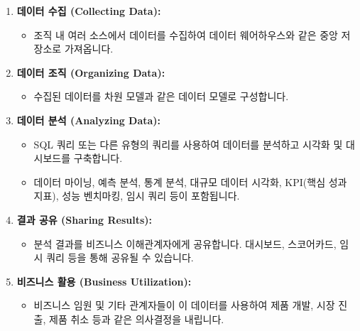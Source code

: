 \documentclass[11pt,a4paper]{article}
\begin{document}
\begin{enumerate}
    \item \textbf{데이터 수집 (Collecting Data):}
    \begin{itemize}
        \item 조직 내 여러 소스에서 데이터를 수집하여 데이터 웨어하우스와 같은 중앙 저장소로 가져옵니다.
    \end{itemize}
    \item \textbf{데이터 조직 (Organizing Data):}
    \begin{itemize}
        \item 수집된 데이터를 차원 모델과 같은 데이터 모델로 구성합니다.
    \end{itemize}
    \item \textbf{데이터 분석 (Analyzing Data):}
    \begin{itemize}
        \item SQL 쿼리 또는 다른 유형의 쿼리를 사용하여 데이터를 분석하고 시각화 및 대시보드를 구축합니다.
        \item 데이터 마이닝, 예측 분석, 통계 분석, 대규모 데이터 시각화, KPI(핵심 성과 지표), 성능 벤치마킹, 임시 쿼리 등이 포함됩니다.
    \end{itemize}
    \item \textbf{결과 공유 (Sharing Results):}
    \begin{itemize}
        \item 분석 결과를 비즈니스 이해관계자에게 공유합니다. 대시보드, 스코어카드, 임시 쿼리 등을 통해 공유될 수 있습니다.
    \end{itemize}
    \item \textbf{비즈니스 활용 (Business Utilization):}
    \begin{itemize}
        \item 비즈니스 임원 및 기타 관계자들이 이 데이터를 사용하여 제품 개발, 시장 진출, 제품 취소 등과 같은 의사결정을 내립니다.
    \end{itemize}
\end{enumerate}
\end{document}

